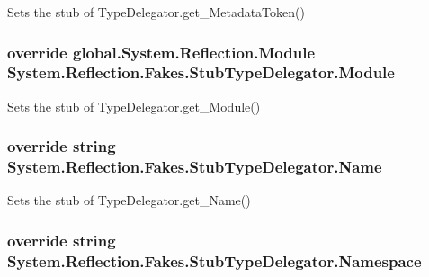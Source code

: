 Sets the stub of Type\-Delegator.\-get\-\_\-\-Metadata\-Token()

\hypertarget{class_system_1_1_reflection_1_1_fakes_1_1_stub_type_delegator_a3dc81d01906cb401375b4b110e5aa7a1}{
\subsubsection[{Module}]{\setlength{\rightskip}{0pt plus 5cm}override global.\-System.\-Reflection.\-Module System.\-Reflection.\-Fakes.\-Stub\-Type\-Delegator.\-Module\hspace{0.3cm}{\ttfamily [get]}}}\label{class_system_1_1_reflection_1_1_fakes_1_1_stub_type_delegator_a3dc81d01906cb401375b4b110e5aa7a1}


Sets the stub of Type\-Delegator.\-get\-\_\-\-Module()

\hypertarget{class_system_1_1_reflection_1_1_fakes_1_1_stub_type_delegator_ad42f1c9ef98a88f5ecd153d863185378}{
\subsubsection[{Name}]{\setlength{\rightskip}{0pt plus 5cm}override string System.\-Reflection.\-Fakes.\-Stub\-Type\-Delegator.\-Name\hspace{0.3cm}{\ttfamily [get]}}}\label{class_system_1_1_reflection_1_1_fakes_1_1_stub_type_delegator_ad42f1c9ef98a88f5ecd153d863185378}


Sets the stub of Type\-Delegator.\-get\-\_\-\-Name()

\hypertarget{class_system_1_1_reflection_1_1_fakes_1_1_stub_type_delegator_a73c07ac911faa5138c2b3a13abd5a1eb}{
\subsubsection[{Namespace}]{\setlength{\rightskip}{0pt plus 5cm}override string System.\-Reflection.\-Fakes.\-Stub\-Type\-Delegator.\-Namespace\hspace{0.3cm}{\ttfamily [get]}}}\label{class_system_1_1_reflection_1_1_fakes_1_1_stub_type_delegator_a73c07ac911faa5138c2b3a13abd5a1eb}


